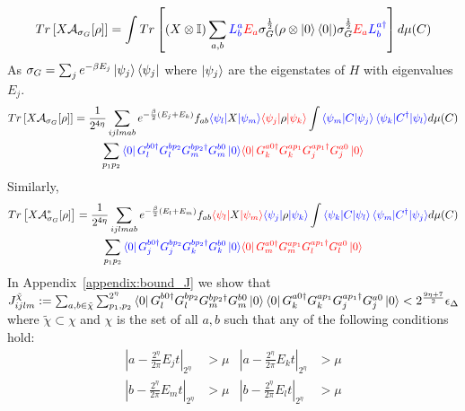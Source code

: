 \documentclass[aps,floatfix,10pt,amssymb,amsfont,amsmath,superscriptaddress,float,nofootinbib,longbibliography,nobalancelastpage,twocolumn]{revtex4-2}
\begin{document}
\begin{widetext}
    \begin{equation}
    Tr\left[X\mathcal{A}_{\sigma_G}[\rho]\right] = \int Tr\left[(X\otimes \mathbb{I})\sum_{a,b}\textcolor{blue}{L^a_b} \textcolor{red}{E_a} \sigma_G^{\frac{1}{2}} (\rho\otimes \ket{0}\bra{0}) \sigma_G^{\frac{1}{2}}\textcolor{red}{E_a}\textcolor{blue}{L^{a\dagger}_b}\right] d\mu(C)
\end{equation}
As $\sigma_G = \sum_j e^{-\beta E_j} \ket{\psi_j}\bra{\psi_j}$ where $\ket{\psi_j}$ are the eigenstates of $H$ with eigenvalues $E_j$. 
\begin{multline}
    Tr\left[X\mathcal{A}_{\sigma_G}[\rho]\right] =\frac{1}{2^{4\eta}} \sum_{ijlmab} e^{-\frac{\beta}{2}(E_j+E_k)}f_{ab} \textcolor{blue}{\bra{\psi_l}}X\textcolor{blue}{\ket{\psi_m}}\textcolor{red}{\bra{\psi_j}}\rho\textcolor{red}{\ket{\psi_k}} \int \textcolor{blue}{\braket{\psi_m|C|\psi_j}\braket{\psi_k|C^{\dagger}|\psi_l}} d\mu(C)\\\sum_{p_1p_2} \textcolor{blue}{\bra{0} G^{b0\dagger}_lG^{bp_2}_lG^{bp_2\dagger}_mG^{b0}_m\ket{0}}
    \textcolor{red}{\bra{0}G_k^{a0\dagger}G_k^{ap_1}G_j^{ap_1\dagger}G_j^{a0}\ket{0}}
\end{multline}
Similarly,
\begin{multline}
    Tr\left[X\mathcal{A}^*_{\sigma_G}[\rho]\right] =\frac{1}{2^{4\eta}} \sum_{ijlmab} e^{-\frac{\beta}{2}(E_l+E_m)}f_{ab} \textcolor{red}{\bra{\psi_l}}X\textcolor{red}{\ket{\psi_m}}\textcolor{blue}{\bra{\psi_j}}\rho\textcolor{blue}{\ket{\psi_k}} \int \textcolor{blue}{\braket{\psi_k|C|\psi_l}\braket{\psi_m|C^{\dagger}|\psi_j}} d\mu(C)\\\sum_{p_1p_2} \textcolor{blue}{\bra{0} G^{b0\dagger}_jG^{bp_2}_jG^{bp_2\dagger}_kG^{b0}_k\ket{0}}
    \textcolor{red}{\bra{0}G_m^{a0\dagger}G_m^{ap_1}G_l^{ap_1\dagger}G_l^{a0}\ket{0}}
        \label{eq:A*rho}  
\end{multline}
In Appendix~\ref{appendix:bound_J} we show that $J_{ijlm}^{\tilde\chi}:= \sum_{a,b\in \tilde \chi} \sum_{p_1,p_2}^{2^{\eta}}\bra{0} G^{b0\dagger}_lG^{bp_2}_lG^{bp_2\dagger}_mG^{b0}_m\ket{0}
    \bra{0}G_k^{a0\dagger}G_k^{ap_1}G_j^{ap_1\dagger}G_j^{a0}\ket{0} <  2^{\frac{9 \eta + 7}{2}}\epsilon_{\Delta}$ where $\tilde \chi \subset \chi$ and $\chi$ is the set of all $a,b$ such that any of the following conditions hold:
\begin{equation}
\begin{aligned}
    |a-\frac{2^{\eta}}{2\pi}E_jt|_{2^{\eta}} &> \mu  &|a-\frac{2^{\eta}}{2\pi}E_kt|_{2^{\eta}} &> \mu\\
    |b-\frac{2^{\eta}}{2\pi}E_mt|_{2^{\eta}} &> \mu   &|b-\frac{2^{\eta}}{2\pi}E_lt|_{2^{\eta}}& > \mu

\end{aligned}
\end{equation}
\end{widetext}
\end{document}
